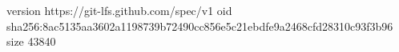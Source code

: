 version https://git-lfs.github.com/spec/v1
oid sha256:8ac5135aa3602a1198739b72490cc856e5c21ebdfe9a2468cfd28310c93f3b96
size 43840
